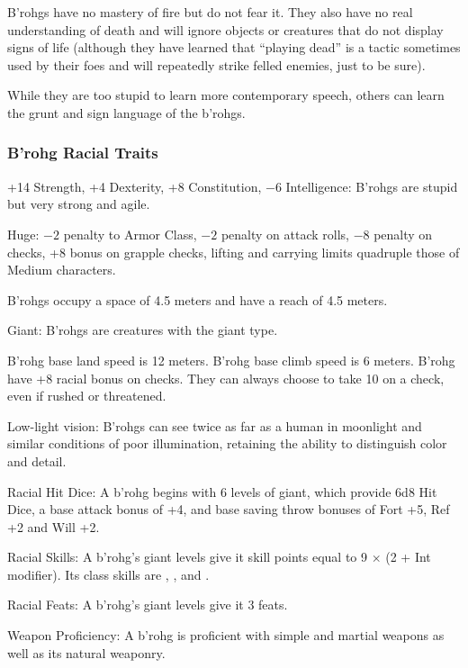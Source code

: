 B'rohgs have no mastery of fire but do not fear it. They also have no real understanding of death and will ignore objects or creatures that do not display signs of life (although they have learned that ``playing dead'' is a tactic sometimes used by their foes and will repeatedly strike felled enemies, just to be sure).

While they are too stupid to learn more contemporary speech, others can learn the grunt and sign language of the b'rohgs.

\subsubsection{B'rohg Racial Traits}
\begin{itemize*}
    \item +14 Strength, +4 Dexterity, +8 Constitution, $-6$ Intelligence: B'rohgs are stupid but very strong and agile.
    \item Huge: $-2$ penalty to Armor Class, $-2$ penalty on attack rolls, $-8$ penalty on  checks, +8 bonus on grapple checks, lifting and carrying limits quadruple those of Medium characters.
    \item B'rohgs occupy a space of 4.5 meters and have a reach of 4.5 meters.
    \item Giant: B'rohgs are creatures with the giant type.
    \item B'rohg base land speed is 12 meters. B'rohg base climb speed is 6 meters. B'rohg have +8 racial bonus on  checks. They can always choose to take 10 on a  check, even if rushed or threatened.
    \item Low-light vision: B'rohgs can see twice as far as a human in moonlight and similar conditions of poor illumination, retaining the ability to distinguish color and detail.
    \item Racial Hit Dice: A b'rohg begins with 6 levels of giant, which provide 6d8 Hit Dice, a base attack bonus of +4, and base saving throw bonuses of Fort +5, Ref +2 and  Will +2.
    \item Racial Skills: A b'rohg's giant levels give it skill points equal to 9 $\times$ (2 + Int modifier). Its class skills are , ,  and .
    \item Racial Feats: A b'rohg's giant levels give it 3 feats.
    \item Weapon Proficiency: A b'rohg is proficient with simple and martial weapons as well as its natural weaponry.

\end{itemize*}
